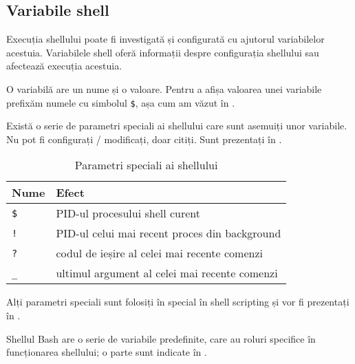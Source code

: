 \subsection{Variabile shell}
\label{sec:cli:shell-func:vars}

Execuția shellului poate fi investigată și configurată cu ajutorul variabilelor
acestuia. Variabilele shell oferă informații despre configurația shellului sau
afectează execuția acestuia.

O variabilă are un nume și o valoare. Pentru a afișa valoarea unei variabile
prefixăm numele cu simbolul \texttt{\$}, așa cum am văzut în .

Există o serie de parametri speciali ai shellului care sunt asemuiți unor
variabile. Nu pot fi configurați / modificați, doar citiți. Sunt prezentați în .

\begin{table}[!htb]
  \caption{Parametri speciali ai shellului}
  \begin{center}
    \begin{tabular}{ p{} p{} }
      \toprule
        \textbf{Nume} &
        \textbf{Efect} \\
      \midrule
        \texttt{\$} &
        PID-ul procesului shell curent \\

        \texttt{!} &
        PID-ul celui mai recent proces din background \\

        \texttt{?} &
        codul de ieșire al celei mai recente comenzi \\

        \texttt{\_} &
        ultimul argument al celei mai recente comenzi \\
      \bottomrule
    \end{tabular}
    \label{tab:cli:special-shell-vars}
  \end{center}
\end{table}

Alți parametri speciali sunt folosiți în special în shell scripting și vor fi
prezentați în .

Shellul Bash are o serie de variabile predefinite, care au roluri specifice în
funcționarea shellului; o parte sunt indicate în .

